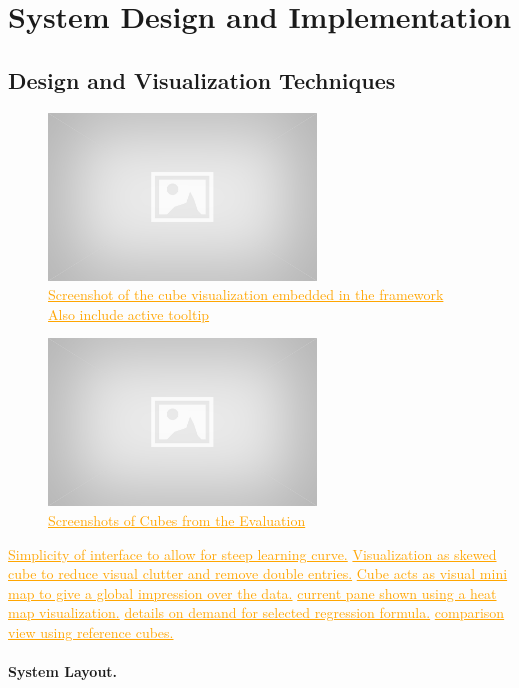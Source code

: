 \documentclass[journal]{style/vgtc} 			          %
\newcommand{\com}[1]{\textcolor{orange}{\uline{#1}}}
\begin{document}
\section{System Design and Implementation} \label{Interaction- and Visualization Techniques}

\subsection{Design and Visualization Techniques} \label{Structure and Workflow}
\begin{figure}[htb]
 \centering
 \includegraphics[width=2.8in]{figures/placeholder}
 \caption{
 \com{Screenshot of the cube visualization embedded in the framework}
 \com{Also include active tooltip}
 }
  \label{fig:Cube}
\end{figure}

\begin{figure}[htb]
 \centering
 \includegraphics[width=2.8in]{figures/placeholder}
 \caption{
 \com{Screenshots of Cubes from the Evaluation}
 }
  \label{fig:comparison}
\end{figure}
\com{Simplicity of interface to allow for steep learning curve.}
\com{Visualization as skewed cube to reduce visual clutter and remove double entries.}
\com{Cube acts as visual mini map to give a global impression over the data.}
\com{current pane shown using a heat map visualization.}
\com{details on demand for selected regression formula.}
\com{comparison view using reference cubes.}

\paragraph{System Layout.}
\end{document}

